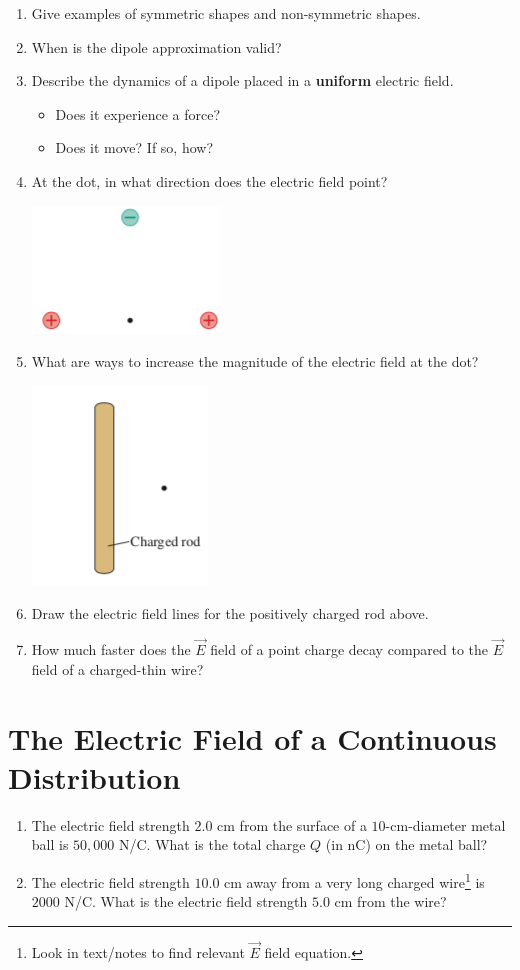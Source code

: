 \documentclass[12pt]{article}
\begin{document}
\begin{enumerate}[label=(\alph*)]
\item Give examples of symmetric shapes and non-symmetric shapes.
\item When is the dipole approximation valid?
\item Describe the dynamics of a dipole placed in a \textbf{uniform} electric field.
\begin{itemize}
	\item Does it experience a force?
	\item Does it move? If so, how?
\end{itemize}
\item At the dot, in what direction does the electric field point?
 
\includegraphics[width=.2\linewidth]{W2a_Fig1.png}
\item What are ways to increase the magnitude of the electric field at the dot?

\includegraphics[width=.2\linewidth]{W2a_Fig2}
\item Draw the electric field lines for the positively charged rod above.
\item How much faster does the $\vec{E}$ field of a point charge decay compared to the $\vec{E}$ field of a charged-thin wire?
\end{enumerate}

\section{The Electric Field of a Continuous Distribution}

\begin{enumerate}[label=(\alph*)]

	\item The electric field strength $2.0$ cm from the surface of a $10$-cm-diameter metal ball is $50,000$ N/C. What is the total  charge $Q$ (in nC) on the metal ball?
	\item The electric field strength $10.0$ cm away from a very long charged wire\footnote{\label{text}Look in text/notes to find relevant $\vec{E}$ field equation.} is $2000$ N/C. What is the electric field strength $5.0$ cm from the wire?
	
\end{enumerate}
\end{document}
